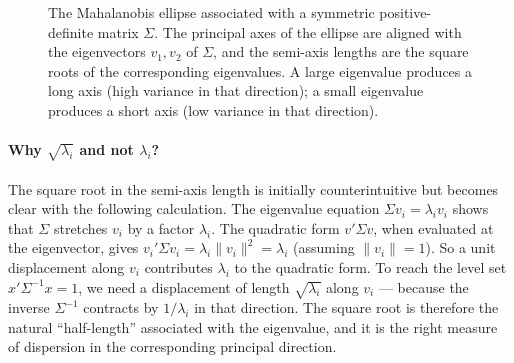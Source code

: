 \documentclass[11pt, a4paper, oneside]{article}
\begin{document}
\begin{figure}[H]
\centering
{}
\caption{The Mahalanobis ellipse associated with a symmetric
positive-definite matrix $\Sigma$. The principal axes of the ellipse
are aligned with the eigenvectors $v_1, v_2$ of $\Sigma$, and the
semi-axis lengths are the square roots of the corresponding
eigenvalues. A large eigenvalue produces a long axis (high variance
in that direction); a small eigenvalue produces a short axis (low
variance in that direction).}
\label{fig:ellipsoid}
\end{figure}

\paragraph{Why $\sqrt{\lambda_i}$ and not $\lambda_i$?}
The square root in the semi-axis length is initially counterintuitive
but becomes clear with the following calculation. The eigenvalue
equation $\Sigma v_i = \lambda_i v_i$ shows that $\Sigma$ stretches
$v_i$ by a factor $\lambda_i$. The quadratic form $v' \Sigma v$, when
evaluated at the eigenvector, gives
$v_i' \Sigma v_i = \lambda_i \|v_i\|^2 = \lambda_i$ (assuming
$\|v_i\| = 1$). So a unit displacement along $v_i$ contributes
$\lambda_i$ to the quadratic form. To reach the level set
$x' \Sigma^{-1} x = 1$, we need a displacement of length
$\sqrt{\lambda_i}$ along $v_i$ — because the inverse $\Sigma^{-1}$
contracts by $1/\lambda_i$ in that direction. The square root is
therefore the natural ``half-length'' associated with the eigenvalue,
and it is the right measure of dispersion in the corresponding
principal direction.
\end{document}

